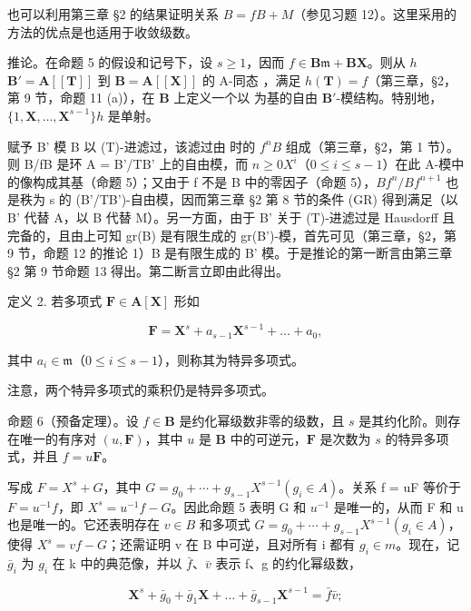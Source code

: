 也可以利用第三章 §2 的结果证明关系 \(B = fB + M\)（参见习题 12）。这里采用的方法的优点是也适用于收敛级数。

推论。在命题 5 的假设和记号下，设 \(s \geqslant 1\)，因而 \(f \in \mathbf{B}\mathfrak{m} + \mathbf{B}\mathbf{X}\)。则从 \(h\)\(\mathbf{B}' = \mathbf{A}[[\mathbf{T}]]\) 到 \(\mathbf{B} = \mathbf{A}[[\mathbf{X}]]\) 的 A-同态 ，满足 \(h(\mathbf{T}) = f\)（第三章，§2，第 9 节，命题 11 (a)），在 \(\mathbf{B}\) 上定义一个以  为基的自由 \(\mathbf{B}'\)-模结构。特别地，\(\{1, \mathbf{X}, \ldots, \mathbf{X}^{s-1}\}\)\(h\) 是单射。

赋予 B' 模 B 以 (T)-进滤过，该滤过由  时的 \(f^{n}B\) 组成（第三章，§2，第 1 节）。则 B/fB 是环 A = B'/TB' 上的自由模，而 \(n \geqslant 0\)\(X^{i}\)（\(0 \leqslant i \leqslant s - 1\)）在此 A-模中的像构成其基（命题 5）；又由于 f 不是 B 中的零因子（命题 5），\(Bf^{n}/Bf^{n+1}\) 也是秩为 s 的 (B'/TB')-自由模，因而第三章 §2 第 8 节的条件 (GR) 得到满足（以 B' 代替 A，以 B 代替 M）。另一方面，由于 B' 关于 (T)-进滤过是 Hausdorff 且完备的，且由上可知 gr(B) 是有限生成的 gr(B')-模，首先可见（第三章，§2，第 9 节，命题 12 的推论 1）B 是有限生成的 B' 模。于是推论的第一断言由第三章 §2 第 9 节命题 13 得出。第二断言立即由此得出。

定义 2. 若多项式 \(\mathbf{F} \in \mathbf{A}[\mathbf{X}]\) 形如

\[
\mathbf {F} = \mathbf {X} ^ {s} + a _ {s - 1} \mathbf {X} ^ {s - 1} + \dots + a _ {0},
\]

其中 \(a_{i} \in \mathfrak{m}\)（\(0 \leqslant i \leqslant s - 1\)），则称其为特异多项式。

注意，两个特异多项式的乘积仍是特异多项式。

命题 6（预备定理）。设 \(f \in \mathbf{B}\) 是约化幂级数非零的级数，且 \(s\) 是其约化阶。则存在唯一的有序对 \((u, \mathbf{F})\)，其中 \(u\) 是 \(\mathbf{B}\) 中的可逆元，\(\mathbf{F}\) 是次数为 \(s\) 的特异多项式，并且 \(f = u\mathbf{F}\)。

写成 \(F = X^{s} + G\)，其中 \(G = g_{0} + \cdots + g_{s-1}X^{s-1} (g_{i} \in A)\)。关系 f = uF 等价于 \(F = u^{-1}f\)，即 \(X^{s} = u^{-1}f - G\)。因此命题 5 表明 G 和 \(u^{-1}\) 是唯一的，从而 F 和 u 也是唯一的。它还表明存在 \(v \in B\) 和多项式 \(G = g_{0} + \cdots + g_{s-1}X^{s-1} (g_{i} \in A)\)，使得 \(X^{s} = vf - G\)；还需证明 v 在 B 中可逆，且对所有 i 都有 \(g_{i} \in m\)。现在，记 \(\bar{g}_{i}\) 为 \(g_{i}\) 在 k 中的典范像，并以 \(\bar{f}\)、\(\bar{v}\) 表示 f、g 的约化幂级数，

\[
\mathbf {X} ^ {s} + \bar {g} _ {0} + \bar {g} _ {1} \mathbf {X} + \dots + \bar {g} _ {s - 1} \mathbf {X} ^ {s - 1} = \bar {f} \bar {v};
\]

